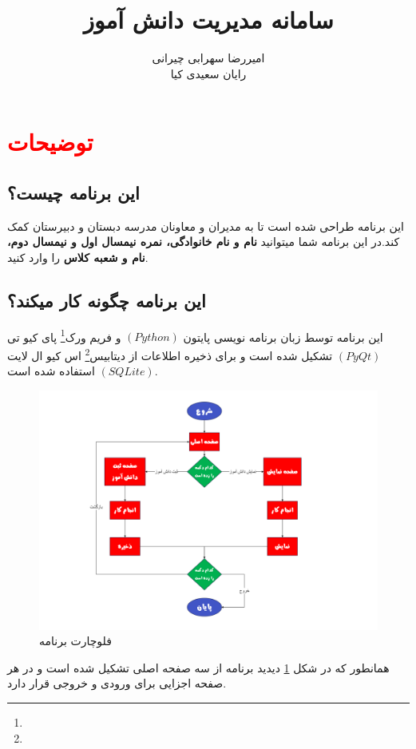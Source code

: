 \documentclass{article}
\title{سامانه مدیریت دانش آموز}
\author{
	امیررضا سهرابی چیرانی\\
	رایان سعیدی کیا
}
\begin{document}
	\maketitle
	\cleardoublepage
	\section*{{\huge \textcolor{red}{\textbf{توضیحات}}}}
	\subsection*{این برنامه چیست؟}
	
	این برنامه طراحی شده است تا به مدیران و معاونان مدرسه دبستان و دبیرستان کمک کند.در این برنامه شما میتوانید \textbf{نام و نام خانوادگی، نمره نیمسال اول و نیمسال دوم، نام و شعبه کلاس} را وارد کنید.
	
	\subsection*{این برنامه چگونه کار میکند؟}
	این برنامه توسط زبان برنامه نویسی پایتون $ (Python) $ و فریم ورک\footnote{} پای کیو تی $ (PyQt) $ تشکیل شده است و برای ذخیره اطلاعات از دیتابیس\footnote{} اس کیو ال لایت $ (SQLite) $ استفاده شده است.
	
	\begin{figure}[h!]
		\centering
		\includegraphics[width=\linewidth]{flo.png}
		\caption{فلوچارت برنامه}\label{pic1}
	\end{figure}

همانطور که در شکل \ref{pic1} دیدید برنامه از سه صفحه اصلی تشکیل شده است و در هر صفحه اجزایی برای ورودی و خروجی قرار دارد.\\
\end{document}
